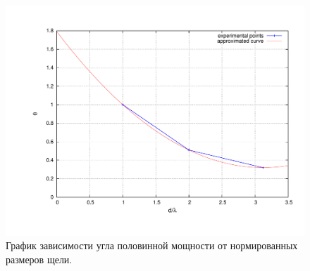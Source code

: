 \documentclass[10pt,a4paper,oneside, reqno]{amsproc}
\begin{document}
\begin{figure}[h!t]
    \centering
    \includegraphics[width = \textwidth]{plot4-2.pdf}
    \vspace{-30pt}
    \caption{График зависимости угла половинной мощности от нормированных размеров щели.}
    \label{fig:plot5}
\end{figure}
\end{document}
